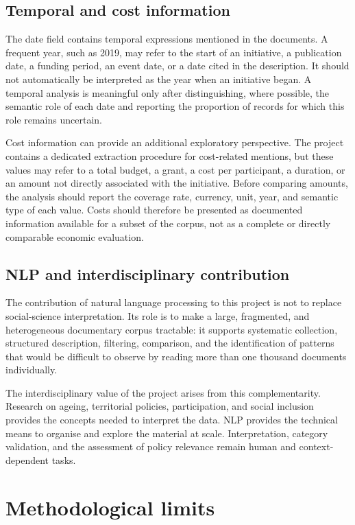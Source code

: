 \subsection{Temporal and cost information}

The date field contains temporal expressions mentioned in the documents. A
frequent year, such as 2019, may refer to the start of an initiative, a
publication date, a funding period, an event date, or a date cited in the
description. It should not automatically be interpreted as the year when an
initiative began. A temporal analysis is meaningful only after distinguishing,
where possible, the semantic role of each date and reporting the proportion of
records for which this role remains uncertain.

Cost information can provide an additional exploratory perspective. The project
contains a dedicated extraction procedure for cost-related mentions, but these
values may refer to a total budget, a grant, a cost per participant, a duration,
or an amount not directly associated with the initiative. Before comparing
amounts, the analysis should report the coverage rate, currency, unit, year,
and semantic type of each value. Costs should therefore be presented as
documented information available for a subset of the corpus, not as a complete
or directly comparable economic evaluation.

\subsection{NLP and interdisciplinary contribution}

The contribution of natural language processing to this project is not to
replace social-science interpretation. Its role is to make a large, fragmented,
and heterogeneous documentary corpus tractable: it supports systematic
collection, structured description, filtering, comparison, and the
identification of patterns that would be difficult to observe by reading more
than one thousand documents individually.

The interdisciplinary value of the project arises from this complementarity.
Research on ageing, territorial policies, participation, and social inclusion
provides the concepts needed to interpret the data. NLP provides the technical
means to organise and explore the material at scale. Interpretation, category
validation, and the assessment of policy relevance remain human and
context-dependent tasks.

\section{Methodological limits}

